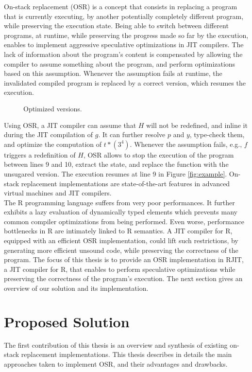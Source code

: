 On-stack replacement (OSR) is a concept that consists in replacing a program that is currently executing, by another potentially completely different program, while preserving the execution state.
Being able to switch between different programs, at runtime, while preserving the progress made so far by the execution, enables to implement aggressive speculative optimizations in JIT compilers.
The lack of information about the program's content is compensated by allowing the compiler to assume something about the program, and perform optimizations based on this assumption.
Whenever the assumption fails at runtime, the invalidated compiled program is replaced by a correct version, which resumes the execution.\\

\begin{wrapfigure}[13]{l}{6.5cm}
\caption{Optimized versions.}
\end{wrapfigure}
Using OSR, a JIT compiler can assume that $H$ will not be redefined, and inline it during the JIT compilation of $g$.
It can further resolve $p$ and $y$, type-check them, and optimize the computation of $t * (3 ^ 4)$.
Whenever the assumption fails, e.g., $f$ triggers a redefinition of $H$, OSR allows to stop the execution of the program between lines 9 and 10, extract the state, and replace the function with the unsugared version.
The execution resumes at line 9 in Figure \ref{fig:example}.
On-stack replacement implementations are state-of-the-art features in advanced virtual machines and JIT compilers.\\


The R programming language suffers from very poor performances. 
It further exhibits a lazy evaluation of dynamically typed elements which prevents many common compiler optimizations from being performed.
Even worse, performance bottlenecks in R are intimately linked to R semantics. 
A JIT compiler for R, equipped with an efficient OSR implementation, could lift such restrictions, by generating more efficient unsound code, while preserving the correctness of the program.
The focus of this thesis is to provide an OSR implementation in RJIT, a JIT compiler for R, that enables to perform speculative optimizations while preserving the correctness of the program's execution.
The next section gives an overview of our solution and its implementation.\\

\section{Proposed Solution}
The first contribution of this thesis is an overview and synthesis of existing on-stack replacement implementations.
This thesis describes in details the main approaches taken to implement OSR, and their advantages and drawbacks.\\

